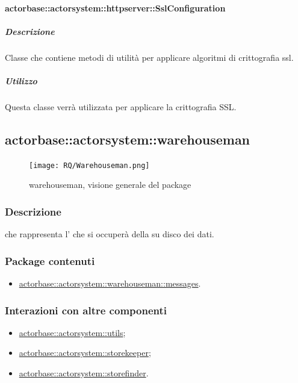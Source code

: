 \documentclass{scalatekids-article}
\begin{document}
\paragraph{actorbase::actorsystem::httpserver::SslConfiguration}
\label{sec:actorbase::actorsystem::httpserver::SslConfiguration}

\subparagraph{Descrizione}
Classe che contiene metodi di utilità per applicare algoritmi di crittografia
ssl.

\subparagraph{Utilizzo}
Questa classe verrà utilizzata per applicare la crittografia SSL.


\subsection{actorbase::actorsystem::warehouseman} %
\label{sec:actorbase::actorsystem::warehouseman}

\begin{figure}[H]
  \begin{center}
    \texttt{[image: RQ/Warehouseman.png]}
    \caption{warehouseman, visione generale del package}
  \end{center}
\end{figure}

\subsubsection{Descrizione}

 che rappresenta l' che si occuperà della
 su disco dei dati.

\subsubsection{Package contenuti}

\begin{itemize}

\item \hyperref[sec:actorbase::actorsystem::warehouseman::messages]{actorbase::actorsystem::warehouseman::messages}.

\end{itemize}

\subsubsection{Interazioni con altre componenti}
\begin{itemize}
\item \hyperref[sec:actorbase::actorsystem::utils]{actorbase::actorsystem::utils};
\item \hyperref[sec:actorbase::actorsystem::storekeeper]{actorbase::actorsystem::storekeeper};
\item \hyperref[sec:actorbase::actorsystem::storefinder]{actorbase::actorsystem::storefinder}.
\end{itemize}
\end{document}
